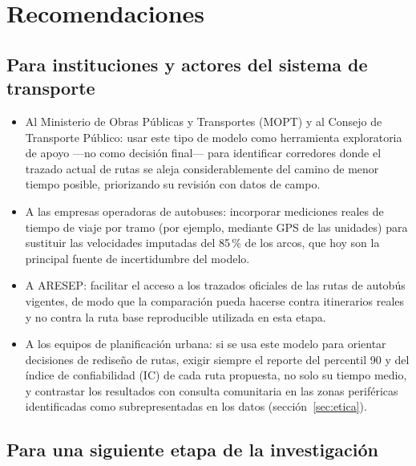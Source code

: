 \documentclass[11pt]{article}
\numberwithin{equation}{section}
\begin{document}
\section{Recomendaciones}\label{sec:recomendaciones}

\subsection{Para instituciones y actores del sistema de transporte}

\begin{itemize}
    \item Al Ministerio de Obras Públicas y Transportes (MOPT) y al Consejo de Transporte Público: usar este tipo de modelo como herramienta exploratoria de apoyo —no como decisión final— para identificar corredores donde el trazado actual de rutas se aleja considerablemente del camino de menor tiempo posible, priorizando su revisión con datos de campo.
    \item A las empresas operadoras de autobuses: incorporar mediciones reales de tiempo de viaje por tramo (por ejemplo, mediante GPS de las unidades) para sustituir las velocidades imputadas del 85\,\% de los arcos, que hoy son la principal fuente de incertidumbre del modelo.
    \item A ARESEP: facilitar el acceso a los trazados oficiales de las rutas de autobús vigentes, de modo que la comparación pueda hacerse contra itinerarios reales y no contra la ruta base reproducible utilizada en esta etapa.
    \item A los equipos de planificación urbana: si se usa este modelo para orientar decisiones de rediseño de rutas, exigir siempre el reporte del percentil 90 y del índice de confiabilidad (IC) de cada ruta propuesta, no solo su tiempo medio, y contrastar los resultados con consulta comunitaria en las zonas periféricas identificadas como subrepresentadas en los datos (sección~\ref{sec:etica}).
\end{itemize}

\subsection{Para una siguiente etapa de la investigación}
\end{document}
